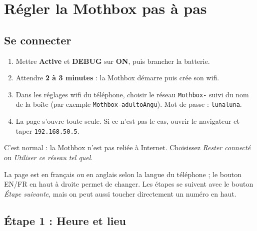 \documentclass[11pt,a4paper,openany]{report}
\newcommand{\sw}[1]{\textsf{\bfseries #1}}
\newcommand{\on}{\textcolor{pslvert}{\textsf{\bfseries ON}}}
\newcommand{\pasc}[2]{\tikz[baseline=(n.base)]\node[circle,fill=#1,text=white,font=\sffamily\bfseries\footnotesize,inner sep=1.5pt,minimum size=1.2em](n){#2};}
\newcommand{\pas}[1]{\pasc{pslrouge}{#1}}
\begin{document}
\chapter{Régler la Mothbox pas à pas}\label{chpas}

\section{Se connecter}

\begin{enumerate}[label=\protect\pas{\arabic*},leftmargin=2.2em,itemsep=5pt]
  \item Mettre \sw{Active} et \sw{DEBUG} sur \on, puis brancher la batterie.
  \item Attendre \textbf{2 à 3 minutes} : la Mothbox démarre puis crée son wifi.
  \item Dans les réglages wifi du téléphone, choisir le réseau \texttt{Mothbox-} suivi du nom de la boîte (par exemple \texttt{Mothbox-adultoAngu}). Mot de passe : \texttt{lunaluna}.
  \item La page s'ouvre toute seule. Si ce n'est pas le cas, ouvrir le navigateur et taper \texttt{192.168.50.5}.
\end{enumerate}

\begin{astuce}
C'est normal : la Mothbox n'est pas reliée à Internet. Choisissez \emph{Rester connecté} ou \emph{Utiliser ce réseau tel quel}.
\end{astuce}

La page est en français ou en anglais selon la langue du téléphone ; le bouton \textsf{EN}/\textsf{FR} en haut à droite permet de changer. Les étapes se suivent avec le bouton \emph{Étape suivante}, mais on peut aussi toucher directement un numéro en haut.

\section{Étape 1 : Heure et lieu}
\end{document}
